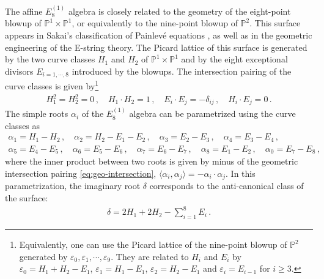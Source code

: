 \documentclass[11pt, a4paper]{article}
\theoremstyle{definition}
\begin{document}
The affine $ E_8^{(1)} $ algebra is closely related to the geometry of the eight-point blowup of $ \mathbb{P}^1 \times \mathbb{P}^1 $, or equivalently to the nine-point blowup of $ \mathbb{P}^2 $. This surface appears in Sakai's classification of Painlev\'e equations \cite{Sakai:2001}, as well as in the geometric engineering of the E-string theory. The Picard lattice of this surface is generated by the two curve classes $ H_1 $ and $ H_2 $ of $ \mathbb{P}^1 \times \mathbb{P}^1 $ and by the eight exceptional divisors $ E_{i=1,\cdots,8} $ introduced by the blowups. The intersection pairing of the curve classes is given by\footnote{\label{note:dP9}Equivalently, one can use the Picard lattice of the nine-point blowup of $ \mathbb{P}^2 $ generated by $ \varepsilon_0, \varepsilon_1, \cdots, \varepsilon_9 $. They are related to $ H_i $ and $ E_i $ by $ \varepsilon_0 = H_1+H_2-E_1 $, $ \varepsilon_1 = H_1-E_1 $, $ \varepsilon_2 = H_2-E_1 $ and $ \varepsilon_i=E_{i-1} $ for $ i\geq 3 $.}
\begin{align}\label{eq:geo-intersection}
    H_1^2 = H_2^2 = 0 \, , \quad
    H_1 \cdot H_2 = 1 \, , \quad
    E_i \cdot E_j = -\delta_{ij} \, , \quad
    H_i \cdot E_j = 0\,.
\end{align}
The simple roots $ \alpha_i $ of the $ E_8^{(1)} $ algebra can be parametrized using the curve classes as
\begin{gather}\label{eq:E8-geometry}
    \alpha_1 = H_1-H_2 \, , \quad
    \alpha_2 = H_2 - E_1 - E_2 \, , \quad
    \alpha_3 = E_2 - E_3 \, , \quad
    \alpha_4 = E_3 - E_4 \, , \\
    \alpha_5 = E_4 - E_5 \, , \quad
    \alpha_6 = E_5 - E_6 \, , \quad
    \alpha_7 = E_6 - E_7 \, , \quad
    \alpha_8 = E_1 - E_2 \, , \quad
    \alpha_0 = E_7 - E_8 \, ,  \nonumber
\end{gather}
where the inner product between two roots is given by minus of the geometric intersection pairing \eqref{eq:geo-intersection}, $ \langle \alpha_i, \alpha_j \rangle = -\alpha_i \cdot \alpha_j $. In this parametrization, the imaginary root $ \delta $ corresponds to the anti-canonical class of the surface:
\begin{align}
    \delta = 2H_1 + 2H_2 - \sum_{i=1}^8 E_i \, .
\end{align}
\end{document}
